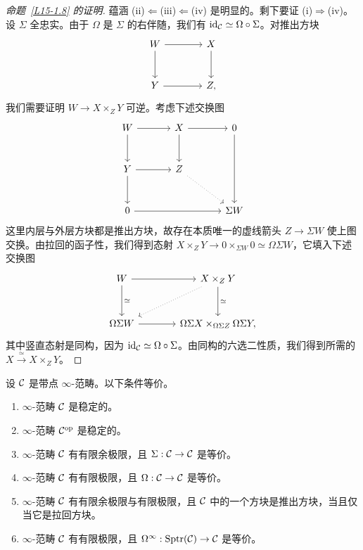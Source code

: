 \begin{proof}[命题~\ref{L15-1.8} 的证明]
蕴涵 (ii)$\Leftarrow$(iii)$\Leftarrow$(iv) 是明显的。剩下要证 (i)$\Rightarrow$(iv)。设 $\Sigma$ 全忠实。由于 $\Omega$ 是 $\Sigma$ 的右伴随，我们有 $\operatorname{id}_{\mathcal{C}}\simeq\Omega\circ\Sigma$。对推出方块
\[
\begin{tikzcd}[column sep=3.8em,row sep=2.8em]
W \arrow[r] \arrow[d] & X \arrow[d] \\
Y \arrow[r] & Z,
\end{tikzcd}
\]
我们需要证明 $W\to X\times_{Z}Y$ 可逆。考虑下述交换图
\[
\begin{tikzcd}[column sep=3.4em,row sep=2.8em]
W \arrow[r] \arrow[d] & X \arrow[r] \arrow[d] & 0 \arrow[dd] \\
Y \arrow[r] \arrow[d] & Z \arrow[dr, dotted] & \\
0 \arrow[rr] & & \Sigma W
\end{tikzcd}
\]
这里内层与外层方块都是推出方块，故存在本质唯一的虚线箭头 $Z\to\Sigma W$ 使上图交换。由拉回的函子性，我们得到态射 $X\times_{Z}Y\to 0\times_{\Sigma W}0\simeq\Omega\Sigma W$，它填入下述交换图
\[
\begin{tikzcd}[column sep=3.8em,row sep=3em]
W \arrow[r] \arrow[d,"\simeq"] & X\times_{Z}Y \arrow[d,"\simeq"] \arrow[dl, dotted] \\
\Omega\Sigma W \arrow[r] & \Omega\Sigma X\times_{\Omega\Sigma Z}\Omega\Sigma Y,
\end{tikzcd}
\]
其中竖直态射是同构，因为 $\operatorname{id}_{\mathcal{C}}\simeq\Omega\circ\Sigma$。由同构的六选二性质，我们得到所需的 $X\xrightarrow{\ \simeq\ }X\times_{Z}Y$。
\end{proof}

\begin{proposition}\label{L15-1.10}
设 $\mathcal{C}$ 是带点 $\infty$-范畴。以下条件等价。
\begin{enumerate}[label=(\alph*),leftmargin=2.4em,itemsep=0.1em]
\item $\infty$-范畴 $\mathcal{C}$ 是稳定的。
\item $\infty$-范畴 $\mathcal{C}^{\mathrm{op}}$ 是稳定的。
\item $\infty$-范畴 $\mathcal{C}$ 有有限余极限，且 $\Sigma:\mathcal{C}\to\mathcal{C}$ 是等价。
\item $\infty$-范畴 $\mathcal{C}$ 有有限极限，且 $\Omega:\mathcal{C}\to\mathcal{C}$ 是等价。
\item $\infty$-范畴 $\mathcal{C}$ 有有限余极限与有限极限，且 $\mathcal{C}$ 中的一个方块是推出方块，当且仅当它是拉回方块。
\item $\infty$-范畴 $\mathcal{C}$ 有有限极限，且 $\Omega^{\infty}:\mathrm{Sptr}(\mathcal{C})\to\mathcal{C}$ 是等价。
\end{enumerate}
\end{proposition}

